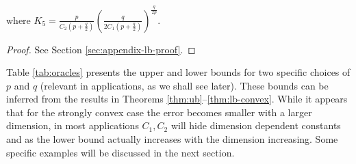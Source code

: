  where $K_5 = \frac{p}{C_2(p+\tfrac{q}{2})} \left(\frac{q}{2C_1(p+\tfrac{q}{2})}\right)^{\frac{q}{2p}}$.
\begin{proof}
 See Section \ref{sec:appendix-lb-proof}.
\end{proof}
Table \ref{tab:oracles} presents the upper and lower bounds for two specific choices of $p$ and $q$ (relevant in applications, as we shall see later). These bounds can be inferred from the results in Theorems \ref{thm:ub}--\ref{thm:lb-convex}.
While it appears that for the strongly convex case the error becomes smaller with a larger dimension,
in most applications $C_1, C_2$ will hide dimension dependent constants
and as the lower bound actually increases with the dimension increasing.
Some specific examples will be discussed in the next section.


